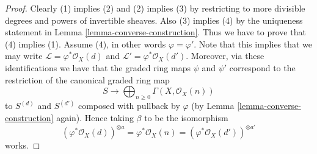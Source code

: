 \documentclass{stacks-project}
\theoremstyle{plain}
\theoremstyle{definition}
\theoremstyle{remark}
\numberwithin{equation}{subsection}
\begin{document}
\begin{proof}
Clearly (1) implies (2) and (2) implies (3) by restricting to
more divisible degrees and powers of invertible sheaves.
Also (3) implies (4) by the uniqueness statement
in Lemma \ref{lemma-converse-construction}.
Thus we have to prove that (4) implies (1). Assume (4),
in other words $\varphi = \varphi'$.
Note that this implies that we may write
$\mathcal{L} = \varphi^*\mathcal{O}_X(d)$ and
$\mathcal{L}' = \varphi^*\mathcal{O}_X(d')$.
Moreover, via these identifications we have that the graded ring
maps $\psi$ and $\psi'$ correspond to the restriction of the canonical
graded ring map
$$
S \longrightarrow \bigoplus\nolimits_{n \geq 0} \Gamma(X, \mathcal{O}_X(n))
$$
to $S^{(d)}$ and $S^{(d')}$ composed with pullback by $\varphi$
(by Lemma \ref{lemma-converse-construction} again). Hence taking
$\beta$ to be the isomorphism
$$
(\varphi^*\mathcal{O}_X(d))^{\otimes a} =
\varphi^*\mathcal{O}_X(n) =
(\varphi^*\mathcal{O}_X(d'))^{\otimes a'}
$$
works.
\end{proof}
\end{document}
